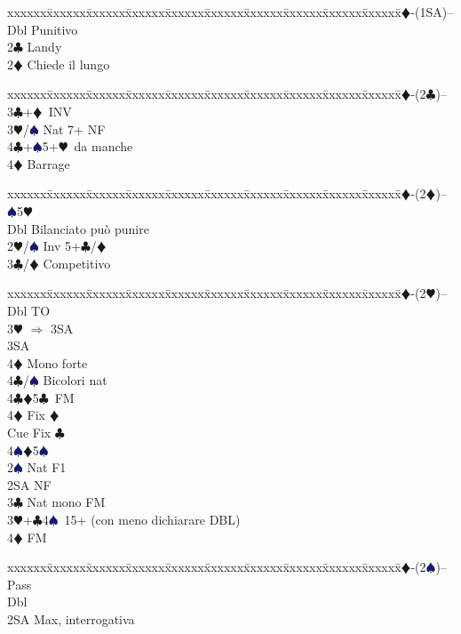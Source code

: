 \documentclass[a4paper,italian]{article}
\newcommand{\BC}{\textcolor{OliveGreen}{$\clubsuit$}}
\newcommand{\BD}{\textcolor{RedOrange}{$\vardiamondsuit$}}
\newcommand{\BH}{\textcolor{Red2}{$\varheartsuit${}}}
\newcommand{\BS}{\textcolor{MidnightBlue}{$\spadesuit${}}}
\newenvironment{bidtable}
{\begin{tabbing}

    xxxxxx\=xxxxxx\=xxxxxx\=xxxxxx\=xxxxxx\=xxxxxx\=xxxxxx\=xxxxxx\=xxxxxx\=xxxxxx\=\kill}
{\end{tabbing} }%
\begin{document}
\begin{multicols}{2}
    \begin{bidtable}
        1\BD-(1SA)--\+\\
        Dbl \> Punitivo\\
        2\BC \> Landy\+\\
        2\BD \> Chiede il lungo\-\-
    \end{bidtable}
    \begin{bidtable}
        1\BD-(2\BC)--\+\\
        3\BC {}+\BD\ INV\\
        3\BH/\BS \> Nat 7+ NF\\
        4\BC {}+\BS 5+\BH\ da manche\\
        4\BD \> Barrage\-
    \end{bidtable}
    \begin{bidtable}
        1\BD-(2\BD)-- \> \BS 5\BH \+\\
        Dbl \> Bilanciato può punire\\
        2\BH/\BS \> Inv 5+\BC /\BD \\
        3\BC/\BD \> Competitivo\-
    \end{bidtable}
    \begin{bidtable}
        1\BD-(2\BH)--\+\\
        Dbl \> TO\+\\
        3\BH\> $\Rightarrow$ 3SA\+\\
        3SA\+\\
        4\BD\> Mono forte\\
        4\BC/\BS\> Bicolori nat \-\-\\
        4\BC{}\BD5\BC\ FM\+\\
        4\BD\> Fix \BD\\
        Cue\> Fix \BC\-\\
        4\BS{}\BD5\BS\-\\
        2\BS \> Nat F1\\
        2SA \> NF\\
        3\BC \> Nat mono FM\\
        3\BH {}+\BC 4\BS\ 15+ (con meno dichiarare DBL)\\
        4\BD \> FM\-
    \end{bidtable}
    \begin{bidtable}
        1\BD-(2\BS)--\+\\
        Pass\+\\
        Dbl\+\\
        2SA\> Max, interrogativa\+\\

\end{bidtable}
\end{multicols}
\end{document}
